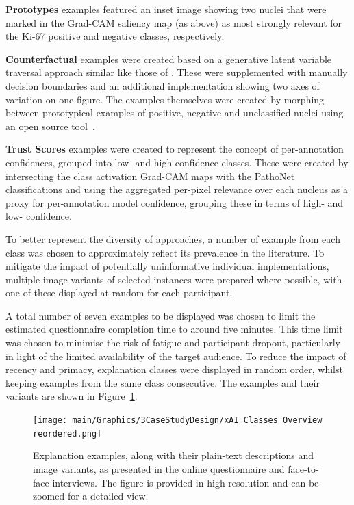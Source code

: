 \textbf{Prototypes} examples featured an inset image showing two nuclei that were marked in the Grad-CAM saliency map (as above) as most strongly relevant for the Ki-67 positive and negative classes, respectively.

\textbf{Counterfactual} examples were created based on a generative latent variable traversal approach similar like those of \citet{liu2019generative}. These were supplemented with manually decision boundaries and an additional implementation showing two axes of variation on one figure. The examples themselves were created by morphing between prototypical examples of positive, negative and unclassified nuclei using an open source tool~\cite{diffmorph:github}.

\textbf{Trust Scores} examples were created to represent the concept of per-annotation confidences, grouped into low- and high-confidence classes. These were created by intersecting the class activation Grad-CAM maps with the PathoNet classifications and using the aggregated per-pixel relevance over each nucleus as a proxy for per-annotation model confidence, grouping these in terms of high- and low- confidence.

To better represent the diversity of approaches, a number of example from each class was chosen to approximately reflect its prevalence in the literature. To mitigate the impact of potentially uninformative individual implementations, multiple image variants of selected instances were prepared where possible, with one of these displayed at random for each participant. 

A total number of seven examples to be displayed was chosen to limit the estimated questionnaire completion time to around five minutes. This time limit was chosen to minimise the risk of fatigue and participant dropout, particularly in light of the limited availability of the target audience. To reduce the impact of recency and primacy, explanation classes were displayed in random order, whilst keeping examples from the same class consecutive. The examples and their variants are shown in Figure~\ref{fig:classes_overview}.

\begin{figure}
\centering
\begin{minipage}[c]{0.85\textwidth}
    \texttt{[image: main/Graphics/3CaseStudyDesign/xAI Classes Overview reordered.png]}
    \caption{Explanation examples, along with their plain-text descriptions and image variants, as presented in the online questionnaire and face-to-face interviews. The figure is provided in high resolution and can be zoomed for a detailed view.}
    \label{fig:classes_overview}
\end{minipage}
\end{figure}

